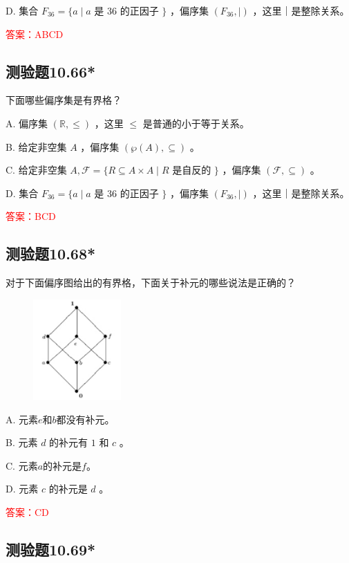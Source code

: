 \documentclass[UTF8, heading=true]{ctexart}
\begin{document}
D. 集合 $F_{36}=\{a \mid a$ 是 36 的正因子 $\}$ ，偏序集 $\left(F_{36}, \mid\right)$ ，这里｜是整除关系。

\textcolor{red}{答案：ABCD}

\subsection{测验题10.66*}

下面哪些偏序集是有界格？

A. 偏序集 $(\mathbb{R}, \leq)$ ，这里 $\leq$ 是普通的小于等于关系。

B. 给定非空集 $A$ ，偏序集 $(\wp(A), \subseteq)$ 。

C. 给定非空集 $A, \mathcal{F}=\{R \subseteq A \times A \mid R$ 是自反的 $\}$ ，偏序集 $(\mathcal{F}, \subseteq)$ 。

D. 集合 $F_{36}=\{a \mid a$ 是 36 的正因子 $\}$ ，偏序集 $\left(F_{36}, \mid\right)$ ，这里｜是整除关系。

\textcolor{red}{答案：BCD}

\subsection{测验题10.68*}

对于下面偏序图给出的有界格，下面关于补元的哪些说法是正确的？

\begin{figure}[H]
  \centering
  \includegraphics[width=0.3\textwidth]{10.68.jpg} %
\end{figure}


A. 元素$e$和$b$都没有补元。

B. 元素 $d$ 的补元有 $1$ 和 $c$ 。

C. 元素$a$的补元是$f$。

D. 元素 $c$ 的补元是 $d$ 。

\textcolor{red}{答案：CD}

\subsection{测验题10.69*}
\end{document}
